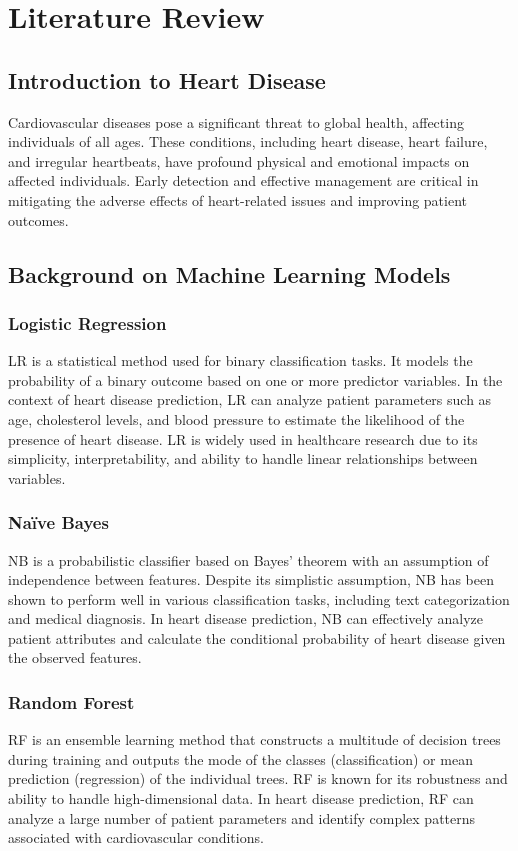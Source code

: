 \chapter{Literature Review}
\label{ch:lit_rev}

\section{Introduction to Heart Disease}
Cardiovascular diseases pose a significant threat to global health, affecting individuals of all ages. These conditions, including heart disease, heart failure, and irregular heartbeats, have profound physical and emotional impacts on affected individuals. Early detection and effective management are critical in mitigating the adverse effects of heart-related issues and improving patient outcomes.

\section{Background on Machine Learning Models}

\subsection{Logistic Regression}
LR is a statistical method used for binary classification tasks. It models the probability of a binary outcome based on one or more predictor variables. In the context of heart disease prediction, LR can analyze patient parameters such as age, cholesterol levels, and blood pressure to estimate the likelihood of the presence of heart disease. LR is widely used in healthcare research due to its simplicity, interpretability, and ability to handle linear relationships between variables.

\subsection{Naïve Bayes}
NB is a probabilistic classifier based on Bayes' theorem with an assumption of independence between features. Despite its simplistic assumption, NB has been shown to perform well in various classification tasks, including text categorization and medical diagnosis. In heart disease prediction, NB can effectively analyze patient attributes and calculate the conditional probability of heart disease given the observed features.

\subsection{Random Forest}
RF is an ensemble learning method that constructs a multitude of decision trees during training and outputs the mode of the classes (classification) or mean prediction (regression) of the individual trees. RF is known for its robustness and ability to handle high-dimensional data. In heart disease prediction, RF can analyze a large number of patient parameters and identify complex patterns associated with cardiovascular conditions.


